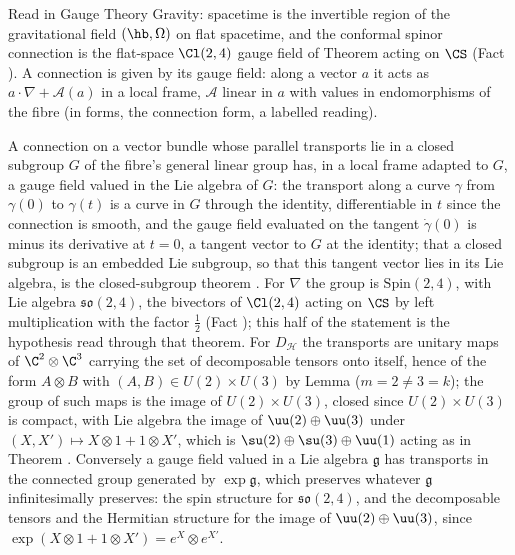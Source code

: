 Read in Gauge Theory Gravity: spacetime is the invertible region of the gravitational field $(\hb, \Omega)$ on flat spacetime, and the conformal spinor connection is the flat-space $\Cl(2,4)$ gauge field of Theorem  acting on $\CS$ (Fact ). A connection is given by its gauge field: along a vector $a$ it acts as $a\cdot\nabla + \mathcal{A}(a)$ in a local frame, $\mathcal{A}$ linear in $a$ with values in endomorphisms of the fibre (in forms, the connection form, a labelled reading).

A connection on a vector bundle whose parallel transports lie in a closed subgroup $G$ of the fibre's general linear group has, in a local frame adapted to $G$, a gauge field valued in the Lie algebra of $G$: the transport along a curve $\gamma$ from $\gamma(0)$ to $\gamma(t)$ is a curve in $G$ through the identity, differentiable in $t$ since the connection is smooth, and the gauge field evaluated on the tangent $\dot\gamma(0)$ is minus its derivative at $t = 0$, a tangent vector to $G$ at the identity; that a closed subgroup is an embedded Lie subgroup, so that this tangent vector lies in its Lie algebra, is the closed-subgroup theorem \cite[Thm.~20.12]{Lee2013}. For $\nabla$ the group is $\mathrm{Spin}(2,4)$, with Lie algebra $\mathfrak{so}(2,4)$, the bivectors of $\Cl(2,4)$ acting on $\CS$ by left multiplication with the factor $\tfrac12$ (Fact ); this half of the statement is the hypothesis read through that theorem. For $D_{\mathcal{H}}$ the transports are unitary maps of $\C^{2} \otimes \C^{3}$ carrying the set of decomposable tensors onto itself, hence of the form $A \otimes B$ with $(A, B) \in U(2) \times U(3)$ by Lemma  ($m = 2 \neq 3 = k$); the group of such maps is the image of $U(2) \times U(3)$, closed since $U(2) \times U(3)$ is compact, with Lie algebra the image of $\uu(2) \oplus \uu(3)$ under $(X, X') \mapsto X \otimes 1 + 1 \otimes X'$, which is $\su(2) \oplus \su(3) \oplus \uu(1)$ acting as in Theorem . Conversely a gauge field valued in a Lie algebra $\mathfrak{g}$ has transports in the connected group generated by $\exp\mathfrak{g}$, which preserves whatever $\mathfrak{g}$ infinitesimally preserves: the spin structure for $\mathfrak{so}(2,4)$, and the decomposable tensors and the Hermitian structure for the image of $\uu(2) \oplus \uu(3)$, since $\exp(X \otimes 1 + 1 \otimes X') = e^{X} \otimes e^{X'}$.

